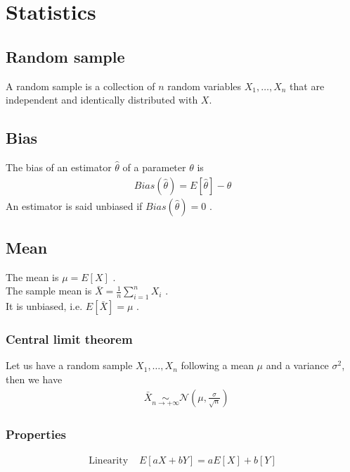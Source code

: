 \documentclass[../main.tex]{subfiles}
\begin{document}
\chapter{Statistics}
\section{Random sample}
A random sample is a collection of $n$ random variables $X_1,\dots, X_n$ that are independent and
identically distributed with $X$.

\section{Bias}
The bias of an estimator $\hat{\theta}$ of a parameter $\theta$ is
\begin{align*}
    Bias(\hat{\theta}) = E[\hat{\theta}] - \theta
\end{align*}
An estimator is said unbiased if $Bias(\hat{\theta}) = 0$ .

\section{Mean}
The mean is $\mu = E[X]$ . \\
The sample mean is $\bar{X} = \frac{1}{n} \sum_{i=1}^{n}{X_i}$ . \\
It is unbiased, i.e. $E[\bar{X}] = \mu$ .
\subsection{Central limit theorem}
Let us have a random sample $X_1,\dots, X_n$ following a mean $\mu$ and a variance $\sigma^2$, then we have
\begin{align*}
    &\bar{X} \underset{n \to +\infty}{\sim} \mathcal{N}(\mu, \frac{\sigma}{\sqrt{n}})
\end{align*}

\subsection{Properties}
\begin{align*}
    \text{Linearity }&E[aX + bY] = aE[X] + b[Y]
\end{align*}
\end{document}
